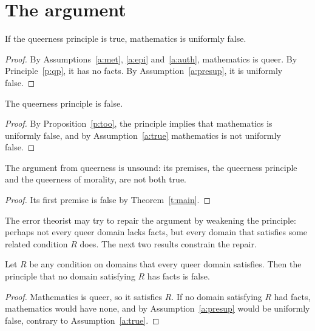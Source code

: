 \documentclass{situationist-preprint}
\begin{document}
\section{The argument}\label{s:arg}

\begin{proposition}\label{p:too}
If the queerness principle is true, mathematics is uniformly false.
\end{proposition}

\begin{proof}
By Assumptions~\ref{a:met}, \ref{a:epi} and~\ref{a:auth}, mathematics is queer. By Principle~\ref{p:qp}, it has no facts. By Assumption~\ref{a:presup}, it is uniformly false.
\end{proof}

\begin{theorem}\label{t:main}
The queerness principle is false.
\end{theorem}

\begin{proof}
By Proposition~\ref{p:too}, the principle implies that mathematics is uniformly false, and by Assumption~\ref{a:true} mathematics is not uniformly false.
\end{proof}

\begin{corollary}\label{c:unsound}
The argument from queerness is unsound: its premises, the queerness principle and the queerness of morality, are not both true.
\end{corollary}

\begin{proof}
Its first premise is false by Theorem~\ref{t:main}.
\end{proof}

The error theorist may try to repair the argument by weakening the principle: perhaps not every queer domain lacks facts, but every domain that satisfies some related condition $R$ does. The next two results constrain the repair.

\begin{corollary}\label{c:weaker}
Let $R$ be any condition on domains that every queer domain satisfies. Then the principle that no domain satisfying $R$ has facts is false.
\end{corollary}

\begin{proof}
Mathematics is queer, so it satisfies $R$. If no domain satisfying $R$ had facts, mathematics would have none, and by Assumption~\ref{a:presup} would be uniformly false, contrary to Assumption~\ref{a:true}.
\end{proof}
\end{document}
